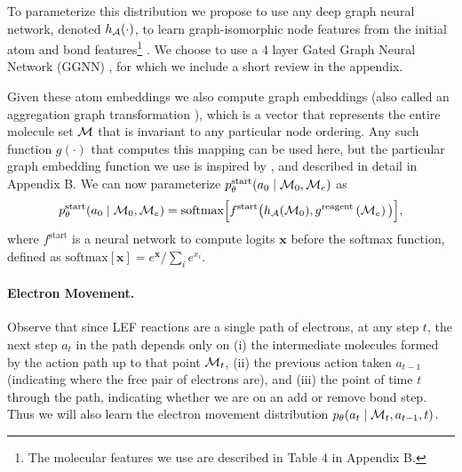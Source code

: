 To parameterize this distribution we propose to use any deep graph neural network, denoted $h_{{\mathcal{A}}}(\cdot)$, to learn graph-isomorphic node features from the initial atom and bond features\footnote{The molecular features we use are described in Table 4 in Appendix B.} \citep{duvenaud2015convolutional,kipf2016semi,li2016gated,gilmer2017neural}. We choose to use a 4 layer Gated Graph Neural Network (GGNN) \citep{li2016gated}, for which we include a short review in the appendix. %

Given these atom embeddings we also compute graph embeddings \citep[\S B.1]{li2018learning} (also called an aggregation graph transformation \citep[\S3]{Johnson2017-pd}), which is a vector that represents the entire molecule set ${\mathcal{M}}$ that is invariant to any particular node ordering. Any such function $g(\cdot)$ that computes this mapping can be used here, but the particular graph embedding function we use is inspired by \cite{li2018learning}, and described in detail in Appendix B. 
We can now parameterize $p_\theta^{\mathrm{start}}(a_0 \mid {\mathcal{M}}_0, {\mathcal{M}}_e)$ as
\begin{align}
p_\theta^{\mathrm{start}}(a_0 \mid  {\mathcal{M}}_0, {\mathcal{M}}_e) = \mbox{softmax}\Big[f^{\mathrm{start}}\big( h_{{\mathcal{A}}}({\mathcal{M}}_0), 
g^{\mathrm{reagent}}\left({\mathcal{M}}_e\right)\big)\Big], 
\end{align}
where $f^{\mathrm{start}}$ is a neural network to compute logits $\mathbf{x}$ before the softmax function, defined as $\mbox{softmax}[\mathbf{x}] = e^{\mathbf{x}}/\sum_{i} e^{x_i}$. %



\paragraph{Electron Movement.}
Observe that since LEF reactions are a single path of electrons, at any step $t$, the next step $a_t$ in the path depends only on (i) the intermediate molecules formed by the action path up to that point ${\mathcal{M}}_t$, (ii) the previous action taken $a_{t-1}$ (indicating where the free pair of electrons are), and (iii) the point of time $t$ through the path, indicating whether we are on an add or remove bond step. Thus we will also learn the electron movement distribution $p_\theta(a_t \mid {\mathcal{M}}_{t}, a_{t-1}, t)$.

